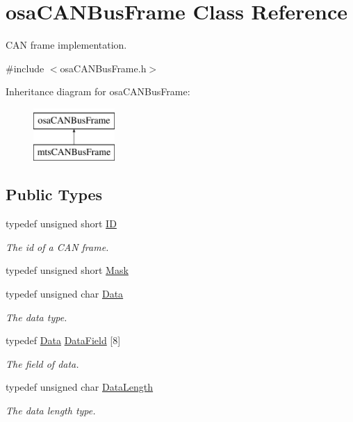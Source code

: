 \hypertarget{classosa_c_a_n_bus_frame}{\section{osa\-C\-A\-N\-Bus\-Frame Class Reference}
\label{classosa_c_a_n_bus_frame}
}


C\-A\-N frame implementation.  




{\ttfamily \#include $<$osa\-C\-A\-N\-Bus\-Frame.\-h$>$}

Inheritance diagram for osa\-C\-A\-N\-Bus\-Frame\-:\begin{figure}[H]
\begin{center}
\leavevmode
\includegraphics[height=2.000000cm]{df/da8/classosa_c_a_n_bus_frame}
\end{center}
\end{figure}
\subsection*{Public Types}
\begin{DoxyCompactItemize}
\item 
typedef unsigned short \hyperlink{classosa_c_a_n_bus_frame_ae917bcfe6427b2055a405716909c6048}{I\-D}
\begin{DoxyCompactList}\small\item\em The id of a C\-A\-N frame. \end{DoxyCompactList}\item 
typedef unsigned short \hyperlink{classosa_c_a_n_bus_frame_a28c1ee7996aa3559ed24871ab5bd9d0d}{Mask}
\item 
typedef unsigned char \hyperlink{classosa_c_a_n_bus_frame_a938f540c9de33b240d3bc4f21c341ba5}{Data}
\begin{DoxyCompactList}\small\item\em The data type. \end{DoxyCompactList}\item 
typedef \hyperlink{classosa_c_a_n_bus_frame_a938f540c9de33b240d3bc4f21c341ba5}{Data} \hyperlink{classosa_c_a_n_bus_frame_ac41162892eefb85a1308d485ec630969}{Data\-Field} \mbox{[}8\mbox{]}
\begin{DoxyCompactList}\small\item\em The field of data. \end{DoxyCompactList}\item 
typedef unsigned char \hyperlink{classosa_c_a_n_bus_frame_ab5bacbd4959a9046925438af889744f4}{Data\-Length}
\begin{DoxyCompactList}\small\item\em The data length type. \end{DoxyCompactList}\end{DoxyCompactItemize}
